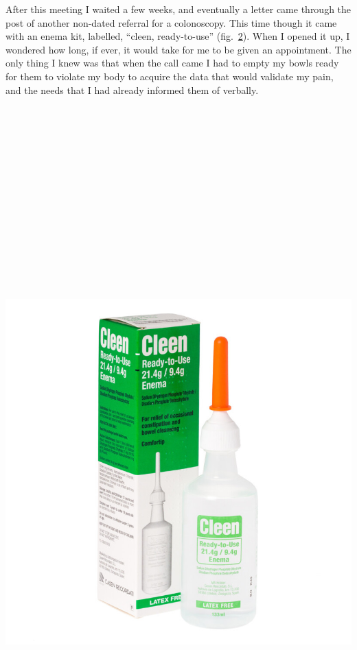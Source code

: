 After this meeting I waited a few weeks, and eventually a letter came
through the post of another non-dated referral for a colonoscopy. This
time though it came with an enema kit, labelled, ``cleen, ready-to-use''
(fig.~\protect\hyperlink{fig:cleen}{2}). When I opened it up, I wondered
how long, if ever, it would take for me to be given an appointment. The
only thing I knew was that when the call came I had to empty my bowls
ready for them to violate my body to acquire the data that would
validate my pain, and the needs that I had already informed them of
verbally.

\includegraphics[width=11.11111in,height=11.11111in]{./media_02_Crip-Tic_of_Vignettes/Pictures/1.png}

